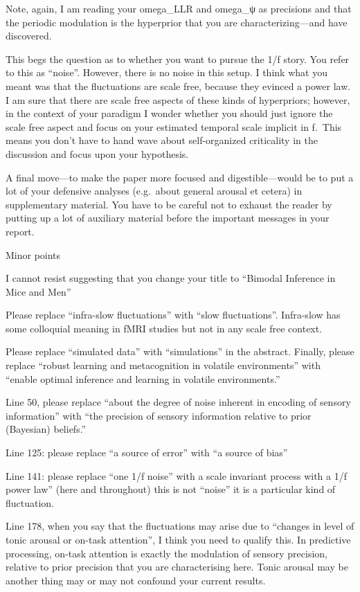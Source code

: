 \documentclass[
]{article}
\begin{document}
Note, again, I am reading your omega\_LLR and omega\_ψ as precisions and
that the periodic modulation is the hyperprior that you are
characterizing---and have discovered.

This begs the question as to whether you want to pursue the 1/f story.
You refer to this as ``noise''. However, there is no noise in this
setup. I think what you meant was that the fluctuations are scale free,
because they evinced a power law. I am sure that there are scale free
aspects of these kinds of hyperpriors; however, in the context of your
paradigm I wonder whether you should just ignore the scale free aspect
and focus on your estimated temporal scale implicit in f.~This means you
don't have to hand wave about self-organized criticality in the
discussion and focus upon your hypothesis.

A final move---to make the paper more focused and digestible---would be
to put a lot of your defensive analyses (e.g.~about general arousal et
cetera) in supplementary material. You have to be careful not to exhaust
the reader by putting up a lot of auxiliary material before the
important messages in your report.

Minor points

I cannot resist suggesting that you change your title to ``Bimodal
Inference in Mice and Men''

Please replace ``infra-slow fluctuations'' with ``slow fluctuations''.
Infra-slow has some colloquial meaning in fMRI studies but not in any
scale free context.

Please replace ``simulated data'' with ``simulations'' in the abstract.
Finally, please replace ``robust learning and metacognition in volatile
environments'' with ``enable optimal inference and learning in volatile
environments.''

Line 50, please replace ``about the degree of noise inherent in encoding
of sensory information'' with ``the precision of sensory information
relative to prior (Bayesian) beliefs.''

Line 125: please replace ``a source of error'' with ``a source of bias''

Line 141: please replace ``one 1/f noise'' with a scale invariant
process with a 1/f power law'' (here and throughout) this is not
``noise'' it is a particular kind of fluctuation.

Line 178, when you say that the fluctuations may arise due to ``changes
in level of tonic arousal or on-task attention'', I think you need to
qualify this. In predictive processing, on-task attention is exactly the
modulation of sensory precision, relative to prior precision that you
are characterising here. Tonic arousal may be another thing may or may
not confound your current results.
\end{document}
